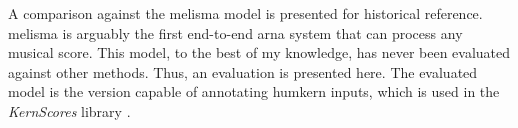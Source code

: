 
A comparison against the \gls{melisma} model is presented
for historical reference. \gls{melisma}
is arguably the first end-to-end \gls{arna} system that can
process any musical score.  This model, to the best of my
knowledge, has never been evaluated against other methods.
Thus, an evaluation is presented here. The evaluated model
is the version capable of annotating \gls{humkern} inputs,
which is used in the \emph{KernScores} library
\parencite{sapp2005online}.
